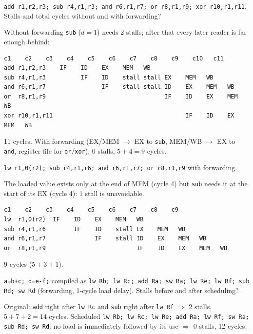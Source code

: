 \documentclass[11pt]{article}
\begin{document}
\begin{exercise}
\texttt{add r1,r2,r3; sub r4,r1,r3; and r6,r1,r7; or r8,r1,r9;
xor r10,r1,r11}. Stalls and total cycles without and with forwarding?
\end{exercise}
\begin{solution}
Without forwarding \texttt{sub} ($d=1$) needs 2 stalls; after that every
later reader is far enough behind:
\begin{lstlisting}[basicstyle=\ttfamily\footnotesize,keywords={}]
                c1    c2    c3    c4    c5    c6    c7    c8    c9    c10   c11
add r1,r2,r3    IF    ID    EX    MEM   WB
sub r4,r1,r3          IF    ID    stall stall EX    MEM   WB
and r6,r1,r7                IF    stall stall ID    EX    MEM   WB
or  r8,r1,r9                                  IF    ID    EX    MEM   WB
xor r10,r1,r11                                      IF    ID    EX    MEM   WB
\end{lstlisting}
11 cycles. With forwarding (EX/MEM $\to$ EX to \texttt{sub}, MEM/WB $\to$ EX
to \texttt{and}, register file for \texttt{or}/\texttt{xor}): 0 stalls,
$5+4 = 9$ cycles.
\end{solution}

\begin{exercise}
\texttt{lw r1,0(r2); sub r4,r1,r6; and r6,r1,r7; or r8,r1,r9} with
forwarding.
\end{exercise}
\begin{solution}
The loaded value exists only at the end of MEM (cycle 4) but \texttt{sub}
needs it at the start of its EX (cycle 4): 1 stall is unavoidable.
\begin{lstlisting}[basicstyle=\ttfamily\footnotesize,keywords={}]
              c1    c2    c3    c4    c5    c6    c7    c8    c9
lw  r1,0(r2)  IF    ID    EX    MEM   WB
sub r4,r1,r6        IF    ID    stall EX    MEM   WB
and r6,r1,r7              IF    stall ID    EX    MEM   WB
or  r8,r1,r9                          IF    ID    EX    MEM   WB
\end{lstlisting}
9 cycles ($5+3+1$).
\end{solution}

\begin{exercise}
\texttt{a=b+c; d=e-f;} compiled as \texttt{lw Rb; lw Rc; add Ra; sw Ra;
lw Re; lw Rf; sub Rd; sw Rd} (forwarding, 1-cycle load delay). Stalls
before and after scheduling?
\end{exercise}
\begin{solution}
Original: \texttt{add} right after \texttt{lw Rc} and \texttt{sub} right
after \texttt{lw Rf} $\Rightarrow$ 2 stalls, $5+7+2 = 14$ cycles.
Scheduled \texttt{lw Rb; lw Rc; lw Re; add Ra; lw Rf; sw Ra; sub Rd; sw Rd}:
no load is immediately followed by its use $\Rightarrow$ 0 stalls, 12
cycles.
\end{solution}
\end{document}
